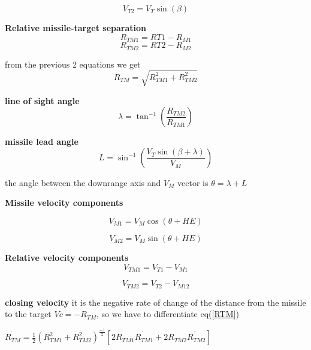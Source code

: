 \begin{equation}
V_{T2} =  V_T \sin(\beta)
\end{equation}

\textbf{Relative missile-target separation}
\begin{equation}
R_{TM1} = R{T1} - R_{M1}
\end{equation}
\begin{equation}
R_{TM2} = R{T2} - R_{M2}
\end{equation}

from the previous 2 equations we get
\begin{equation}
R_{TM} = \sqrt{R_{TM1}^2 + R_{TM2}^2}
\label{RTM}
\end{equation}

\textbf{line of sight angle}
\begin{equation}
\lambda = \tan^{-1} (\dfrac{R_{TM2}}{R_{TM1}})
\label{lambda}
\end{equation}

\textbf{missile lead angle} 
\begin{equation}
L= \sin^{-1}(\dfrac{V_T \sin(\beta + \lambda)}{V_M})
\end{equation}

the angle between the downrange axis and $V_M$ vector is $\theta = \lambda + L$

\textbf{Missile velocity components} 

\begin{equation}
V_{M1} = V_M \cos (\theta + HE)
\end{equation}

\begin{equation}
V_{M2} = V_M \sin (\theta + HE)
\end{equation}

\textbf{Relative velocity components}
\begin{equation}
V_{TM1} = V_{T1} - V_{M1}
\end{equation}

\begin{equation}
V_{TM2} = V_{T2} - V_{M12}
\end{equation}


\textbf{closing velocity} it is the negative rate of change of the distance
from the missile to the target $Vc= -R_{TM} $, so we have to differentiate eq(\ref{RTM})

\begin{center}
	$\dot{R_{TM}}= \frac{1}{2} (R_{TM1}^2 + R_{TM2}^2)^{\frac{-1}{2}} [2 R_{TM1} \dot{R_{TM1}} + 2 R_{TM2} \dot{R_{TM2}}]$
\end{center}

